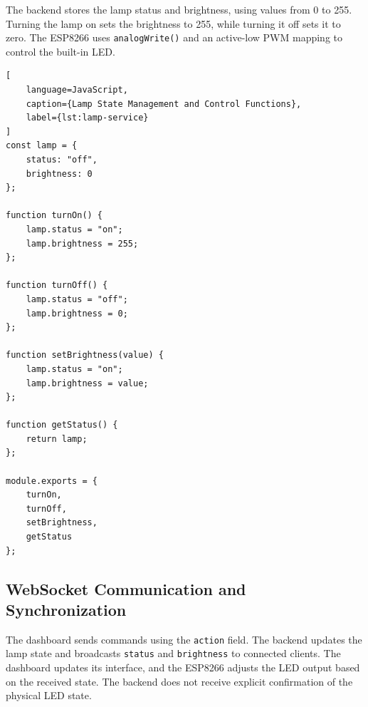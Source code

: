 \documentclass[12pt,a4paper]{article}
\begin{document}
The backend stores the lamp status and brightness, using
values from 0 to 255. Turning the lamp on sets the brightness
to 255, while turning it off sets it to zero. The ESP8266
uses \texttt{analogWrite()} and an active-low PWM mapping
to control the built-in LED.

\vspace{1cm}

\begin{lstlisting}[
    language=JavaScript,
    caption={Lamp State Management and Control Functions},
    label={lst:lamp-service}
]
const lamp = {
    status: "off",
    brightness: 0
};

function turnOn() {
    lamp.status = "on";
    lamp.brightness = 255;
};

function turnOff() {
    lamp.status = "off";
    lamp.brightness = 0;
};

function setBrightness(value) {
    lamp.status = "on";
    lamp.brightness = value;
};

function getStatus() {
    return lamp;
};

module.exports = {
    turnOn,
    turnOff,
    setBrightness,
    getStatus
};
\end{lstlisting}

\newpage
\subsection*{WebSocket Communication and Synchronization}

The dashboard sends commands using the \texttt{action}
field. The backend updates the lamp state and broadcasts
\texttt{status} and \texttt{brightness} to connected clients.
The dashboard updates its interface, and the ESP8266
adjusts the LED output based on the received state. The
backend does not receive explicit confirmation of the
physical LED state.

\vspace{1cm}
\end{document}
